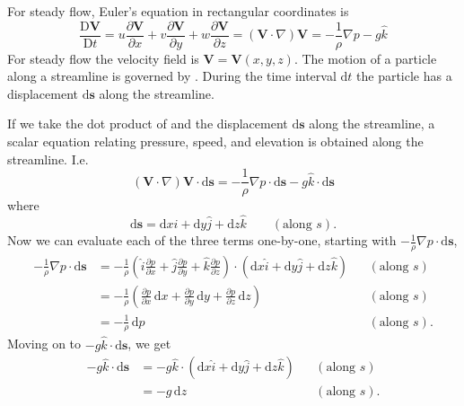 For steady flow, Euler's equation in rectangular coordinates is
\begin{equation}\label{eq:eulrec}
  \frac{\mathrm{D}\textbf{V}}{\mathrm{D}t} = u \frac{\partial \textbf{V}}{\partial x} + v \frac{\partial \textbf{V}}{\partial y} + w \frac{\partial \textbf{V}}{\partial z} = \left( \textbf{V} \cdot \nabla  \right)\textbf{V} = - \frac{1}{\rho} \nabla p - g \hat{k}
\end{equation}
For steady flow the velocity field is $\textbf{V} = \textbf{V}\left( x,y,z \right)$. The motion of a particle along a streamline is governed by . During the time interval $\mathrm{d}t$ the particle has a displacement $\mathrm{d}\textbf{s}$ along the streamline.

If we take the dot product of  and the displacement $\mathrm{d}\textbf{s}$ along the streamline, a scalar equation relating pressure, speed, and elevation is obtained along the streamline. I.e.
\[ 
\left( \textbf{V} \cdot \nabla  \right) \textbf{V} \cdot \mathrm{d}\textbf{s} = - \frac{1}{\rho} \nabla p \cdot \mathrm{d}\textbf{s} - g \hat{k} \cdot \mathrm{d}\textbf{s}
\]
where
\[ 
\mathrm{d}\textbf{s} = \mathrm{d}x \hat{i} + \mathrm{d}y \hat{j} + \mathrm{d} z \hat{k} \qquad (\text{along } s)
.\]
Now we can evaluate each of the three terms one-by-one, starting with $-\frac{1}{\rho} \nabla p \cdot \mathrm{d}\textbf{s}$,
\begin{align*}
  - \frac{1}{\rho} \nabla p \cdot \mathrm{d}\textbf{s} &= - \frac{1}{\rho} \left( \hat{i} \frac{\partial p}{\partial x} + \hat{j} \frac{\partial p}{\partial y} + \hat{k} \frac{\partial p}{\partial z}  \right) \cdot \left( \mathrm{d}x \hat{i} + \mathrm{d} y \hat{j} + \mathrm{d}z \hat{k} \right) & &(\text{along } s) \\
   &= - \frac{1}{\rho} \left( \frac{\partial p}{\partial x} \, \mathrm{d}x + \frac{\partial p}{\partial y} \, \mathrm{d}y + \frac{\partial p}{\partial z} \, \mathrm{d}z \right) & &(\text{along } s) \\
  &= - \frac{1}{\rho} \, \mathrm{d}p & &(\text{along } s)
.\end{align*}
Moving on to $- g \hat{k} \cdot \mathrm{d}\textbf{s}$, we get
\begin{align*}
  - g \hat{k} \cdot \mathrm{d}\textbf{s} &= - g \hat{k} \cdot \left( \mathrm{d}x \hat{i} + \mathrm{d}y \hat{j} + \mathrm{d}z \hat{k} \right) &&(\text{along }s)\\
    &= - g \, \mathrm{d}z & &(\text{along }s)
.\end{align*}
